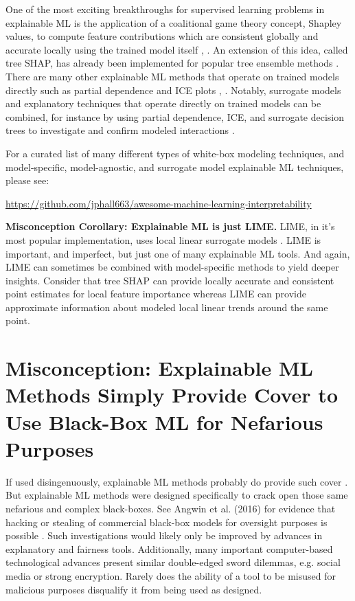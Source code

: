 \documentclass[fleqn]{article}
\begin{document}
One of the most exciting breakthroughs for supervised learning problems in explainable ML is the application of a coalitional game theory concept, Shapley values, to compute feature contributions which are consistent globally and accurate locally using the trained model itself \cite{kononenko2010efficient}, \cite{shapley}. An extension of this idea, called tree SHAP, has already been implemented for popular tree ensemble methods \cite{tree_shap}. There are many other explainable ML methods that operate on trained models directly such as partial dependence and ICE plots \cite{esl}, \cite{ice_plots}. Notably, surrogate models and explanatory techniques that operate directly on trained models can be combined, for instance by using partial dependence, ICE, and surrogate decision trees to investigate and confirm modeled interactions \cite{art_and_sci}. 

For a curated list of many different types of white-box modeling techniques, and model-specific, model-agnostic, and surrogate model explainable ML techniques, please see:
\begin{center}
\url{https://github.com/jphall663/awesome-machine-learning-interpretability}
\end{center}

\textbf{Misconception Corollary: Explainable ML is just LIME.} LIME, in it's most popular implementation, uses local linear surrogate models \cite{lime}. LIME is important, and imperfect, but just one of many explainable ML tools. And again, LIME can sometimes be combined with model-specific methods to yield deeper insights. Consider that tree SHAP can provide locally accurate and consistent point estimates for local feature importance whereas LIME can provide approximate information about modeled local linear trends around the same point.   

\section{Misconception: Explainable ML Methods Simply Provide Cover to Use Black-Box ML for Nefarious Purposes}

If used disingenuously, explainable ML methods probably do provide such cover \cite{fair_washing}. But explainable ML methods were designed specifically to crack open those same nefarious and complex black-boxes. See Angwin et al. (2016) for evidence that hacking or stealing of commercial black-box models for oversight purposes is possible \cite{angwin16}. Such investigations would likely only be improved by advances in explanatory and fairness tools. Additionally, many important computer-based technological advances present similar double-edged sword dilemmas, e.g. social media or strong encryption. Rarely does the ability of a tool to be misused for malicious purposes disqualify it from being used as designed. 
\end{document}
